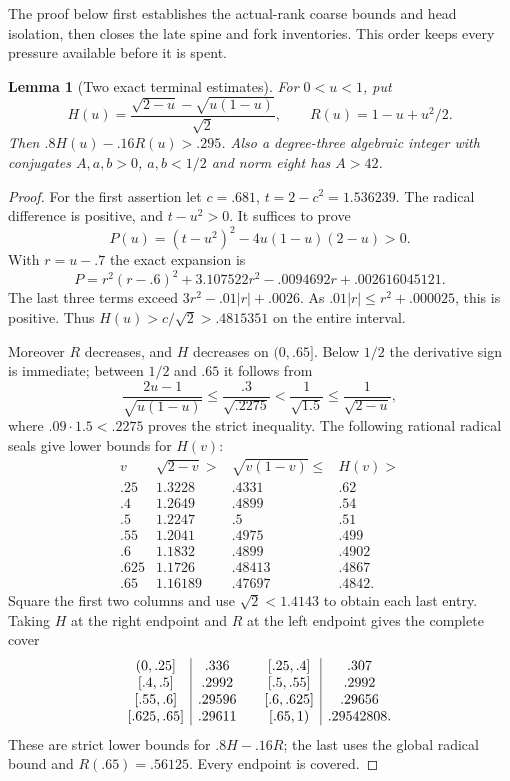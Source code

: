 \documentclass[11pt]{article}
\newtheorem{lemma}[theorem]{Lemma}
\begin{document}
The proof below first establishes the actual-rank coarse bounds and
head isolation, then closes the late spine and fork inventories.
This order keeps every pressure available before it is spent.

\begin{lemma}[Two exact terminal estimates]\label{lem:terminal-scalars}
For $0<u<1$, put
\[
 H(u)=\frac{\sqrt{2-u}-\sqrt{u(1-u)}}{\sqrt2},\qquad
 R(u)=1-u+u^2/2.
\]
Then $.8H(u)-.16R(u)>.295$. Also a degree-three algebraic integer
with conjugates $A,a,b>0$, $a,b<1/2$ and norm eight has $A>42$.
\end{lemma}
\begin{proof}
For the first assertion let $c=.681$, $t=2-c^2=1.536239$.
The radical difference is positive, and $t-u^2>0$.
It suffices to prove
\[
 P(u)=(t-u^2)^2-4u(1-u)(2-u)>0.
\]
With $r=u-.7$ the exact expansion is
\[
P=r^2(r-.6)^2+3.107522r^2-.0094692r+.002616045121.
\]
The last three terms exceed $3r^2-.01|r|+.0026$.
As $.01|r|\le r^2+.000025$, this is positive.
Thus $H(u)>c/\sqrt2>.4815351$ on the entire interval.

Moreover $R$ decreases, and $H$ decreases on $(0,.65]$.
Below $1/2$ the derivative sign is immediate; between $1/2$ and
$.65$ it follows from
\[
 \frac{2u-1}{\sqrt{u(1-u)}}\le\frac{.3}{\sqrt{.2275}}
 <\frac1{\sqrt{1.5}}\le\frac1{\sqrt{2-u}},
\]
where $.09\cdot1.5<.2275$ proves the strict inequality.
The following rational radical seals give lower bounds for $H(v)$:
\[
\begin{array}{c|ccc}
v&\sqrt{2-v}>&\sqrt{v(1-v)}\le&H(v)>\\\hline
.25&1.3228&.4331&.62\\
.4&1.2649&.4899&.54\\
.5&1.2247&.5&.51\\
.55&1.2041&.4975&.499\\
.6&1.1832&.4899&.4902\\
.625&1.1726&.48413&.4867\\
.65&1.16189&.47697&.4842.
\end{array}
\]
Square the first two columns and use $\sqrt2<1.4143$ to obtain
each last entry. Taking $H$ at the right endpoint and $R$ at the
left endpoint gives the complete cover
\[
\begin{array}{c|c@{\qquad}c|c}
(0,.25]&.336&[.25,.4]&.307\\
{}[.4,.5]&.2992&[.5,.55]&.2992\\
{}[.55,.6]&.29596&[.6,.625]&.29656\\
{}[.625,.65]&.29611&[.65,1)&.29542808.
\end{array}
\]
These are strict lower bounds for $.8H-.16R$; the last uses the
global radical bound and $R(.65)=.56125$. Every endpoint is covered.


\end{proof}
\end{document}

